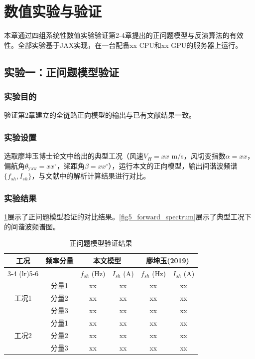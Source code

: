 \documentclass[withoutpreface,bwprint]{cumcmthesis}
\begin{document}
\section{数值实验与验证}

本章通过四组系统性数值实验验证第2-4章提出的正问题模型与反演算法的有效性。全部实验基于JAX实现，在一台配备xx CPU和xx GPU的服务器上运行。

\subsection{实验一：正问题模型验证}

\subsubsection{实验目的}

验证第2章建立的全链路正向模型的输出与已有文献结果一致。

\subsubsection{实验设置}

选取廖坤玉博士论文\cite{liao2019doctor}中给出的典型工况（风速$V_H=xx$ m/s，风切变指数$\alpha=xx$，偏航角$\theta_{\mathrm{yaw}}=xx^\circ$，桨距角$\beta=xx^\circ$），运行本文的正向模型，输出间谐波频谱$\{f_{sh}, I_{sh}\}$，与文献中的解析计算结果进行对比。

\subsubsection{实验结果}

\cref{tab5_forward_validation}展示了正问题模型验证的对比结果。\cref{fig5_forward_spectrum}展示了典型工况下的间谐波频谱图。

\begin{table}[!ht]
\centering
\caption{正问题模型验证结果}
\label{tab5_forward_validation}
\begin{tabular}{cccccc}
\toprule
\multirow{2}{*}{\textbf{工况}} & \multirow{2}{*}{\textbf{频率分量}} & \multicolumn{2}{c}{\textbf{本文模型}} & \multicolumn{2}{c}{\textbf{廖坤玉(2019)}} \\
\cmidrule(lr){3-4} \cmidrule(lr){5-6}
 & & $f_{sh}$ (Hz) & $I_{sh}$ (A) & $f_{sh}$ (Hz) & $I_{sh}$ (A) \\
\midrule
\multirow{3}{*}{工况1} & 分量1 & xx & xx & xx & xx \\
 & 分量2 & xx & xx & xx & xx \\
 & 分量3 & xx & xx & xx & xx \\
\multirow{3}{*}{工况2} & 分量1 & xx & xx & xx & xx \\
 & 分量2 & xx & xx & xx & xx \\
 & 分量3 & xx & xx & xx & xx \\
\bottomrule
\end{tabular}
\end{table}
\end{document}
